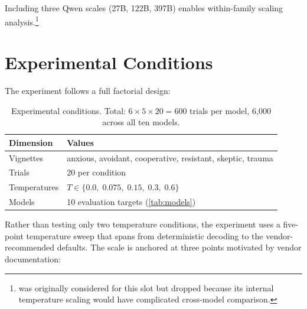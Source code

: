 Including three Qwen scales (27B, 122B, 397B) enables within-family
scaling analysis.\footnote{ was originally
considered for this slot but dropped because its internal temperature
scaling would have complicated cross-model comparison.}


\section{Experimental Conditions}
\label{sec:meth-conditions}

The experiment follows a full factorial design:

\begin{table}[t]
  \centering
  \caption{Experimental conditions. Total: $6 \times 5 \times 20 = 600$ trials per model, 6{,}000 across all ten models.}
  \label{tab:conditions}
  \begin{tabular}{ll}
    \toprule
    Dimension & Values \\
    \midrule
    Vignettes    & anxious, avoidant, cooperative, resistant, skeptic, trauma \\
    Trials       & 20 per condition \\
    Temperatures & $T \in \{0.0,\; 0.075,\; 0.15,\; 0.3,\; 0.6\}$ \\
    Models       & 10 evaluation targets (\autoref{tab:models}) \\
    \bottomrule
  \end{tabular}
\end{table}

Rather than testing only two temperature conditions, the experiment uses a
five-point temperature sweep that spans from deterministic decoding to the
vendor-recommended defaults. The scale is anchored at three points
motivated by vendor documentation:

